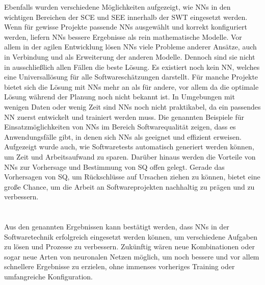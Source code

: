 Ebenfalls wurden verschiedene Möglichkeiten aufgezeigt, wie NNs in den wichtigen Bereichen der SCE und SEE innerhalb der SWT eingesetzt werden. Wenn für gewisse Projekte passende NNs ausgewählt und korrekt konfiguriert werden, liefern NNs bessere Ergebnisse als rein mathematische Modelle. Vor allem in der agilen Entwicklung lösen NNs viele Probleme anderer Ansätze, auch in Verbindung und als Erweiterung der anderen Modelle.
Dennoch sind sie nicht in ausschließlich allen Fällen die beste Lösung. Es existiert noch kein NN, welches eine Universallösung für alle Softwareschätzungen darstellt. Für manche Projekte bietet sich die Lösung mit NNs mehr an als für andere, vor allem da die optimale Lösung während der Planung noch nicht bekannt ist. In Umgebungen mit wenigen Daten oder wenig Zeit sind NNs noch nicht praktikabel, da ein passendes NN zuerst entwickelt und trainiert werden muss.
Die genannten Beispiele für Einsatzmöglichkeiten von NNs im Bereich Softwarequalität zeigen, dass es Anwendungsfälle gibt, in denen sich NNs als geeignet und effizient erweisen. Aufgezeigt wurde auch, wie Softwaretests automatisch generiert werden können, um Zeit und Arbeitsaufwand zu sparen. Darüber hinaus werden die Vorteile von NNs zur Vorhersage und Bestimmung von SQ offen gelegt. Gerade das Vorhersagen von SQ, um Rückschlüsse auf Ursachen ziehen zu können, bietet eine große Chance, um die Arbeit an Softwareprojekten nachhaltig zu prägen und zu verbessern.
\\
\\
\\
Aus den genannten Ergebnissen kann bestätigt werden, dass NNs in der Softwaretechnik erfolgreich eingesetzt werden können, um verschiedene Aufgaben zu lösen und Prozesse zu verbessern.
Zukünftig wären neue Kombinationen oder sogar neue Arten von neuronalen Netzen möglich, um noch bessere und vor allem schnellere Ergebnisse zu erzielen, ohne immenses vorheriges Training oder umfangreiche Konfiguration.
